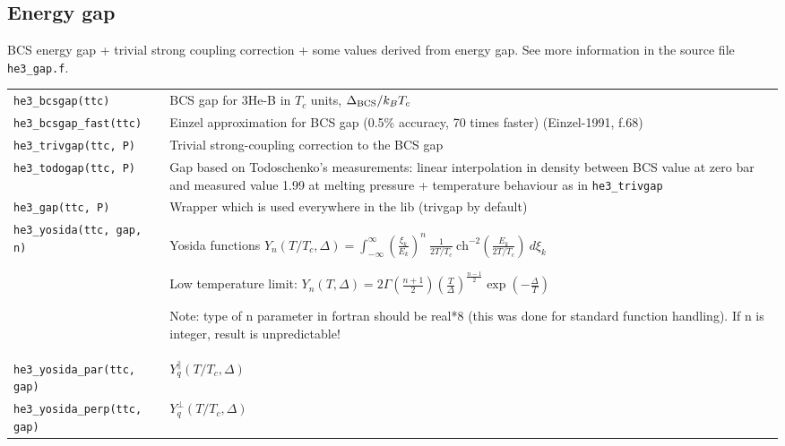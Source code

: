 \documentclass[a4paper]{article}
\begin{document}
{\small}

\eject
\subsection*{Energy gap}

BCS energy gap + trivial strong coupling correction + some values
derived from energy gap. See more information in the
source file {\tt he3\_gap.f}.

\medskip
\noindent\begin{tabular}{lp{11cm}}
\tt he3\_bcsgap(ttc)       & BCS gap for 3He-B in $T_c$ units, $\Delta_{\rm BCS}/ k_B T_c$\\
\tt he3\_bcsgap\_fast(ttc) & Einzel approximation for BCS gap (0.5\% accuracy, 70 times faster)\newline
                             {\small(Einzel-1991, f.68)}\\
\tt he3\_trivgap(ttc, P)   & Trivial strong-coupling correction to the BCS gap\\
\tt he3\_todogap(ttc, P)   & Gap based on Todoschenko's measurements:
                             linear interpolation in density between BCS value at zero bar and
                             measured value 1.99 at melting pressure + temperature behaviour
                             as in {\tt he3\_trivgap}\\
\tt he3\_gap(ttc, P)   &     Wrapper which is used everywhere in the lib (trivgap by default)\\

\tt he3\_yosida(ttc, gap, n) & Yosida functions $\displaystyle Y_n(T/T_c,\Delta) =
                               \int_{-\infty}^{\infty} \left(\frac{\xi_k}{E_k}\right)^n
                               \ \frac{1}{2T/T_c}\ \mbox{ch}^{-2}\left(\frac{E_k}{2T/T_c}\right)\ d\xi_k$\par
                               Low temperature limit:
                               $\displaystyle Y_n(T,\Delta) =
                               2\Gamma\left(\frac{n+1}{2}\right)
                               \left(\frac{T}{\Delta}\right)^{\frac{n-1}{2}}
                               \exp\left(-\frac{\Delta}{T}\right)$\par
                               Note: type of n parameter in fortran should be real*8 (this was done
                               for standard function handling). If n is integer, result is unpredictable!\\
\tt he3\_yosida\_par(ttc, gap)  & $Y_q^\parallel(T/T_c,\Delta)$\\
\tt he3\_yosida\_perp(ttc, gap) & $Y_q^\perp(T/T_c,\Delta)$\\


\end{tabular}
\end{document}
